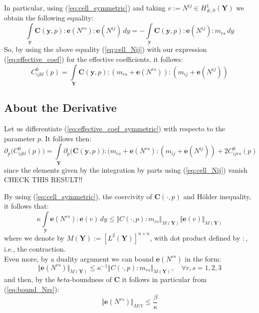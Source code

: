In particular, using (\ref{eq:cell_symmetric}) and taking $v := N^{ij} \in H^1_{\#,0}(\mathbf{Y})$ we obtain the following equality:
\begin{equation}
    \label{eq:cell_Nij}
    \int\limits_{\mathbf{y}}\mathbf{C}(\mathbf{y},p):\mathbf{e}(N^{rs}): \mathbf{e}(N^{ij}) \, dy = - \int\limits_{\mathbf{y}} \mathbf{C}(\mathbf{y},p):\mathbf{e}(N^{ij}):m_{rs}\, dy
\end{equation}
So, by using the above equality (\ref{eq:cell_Nij}) with our expression (\ref{eq:effective_coef}) for the effective coefficients, it follows:
\begin{equation}
    \label{eq:effective_coef_symmetric}
    C_{ijkl}^0(p) = \int\limits_{\mathbf{Y}} \mathbf{C}(\mathbf{y},p):(m_{rs}+\mathbf{e}(N^{rs})):(m_{ij}+\mathbf{e}(N^{ij}))
\end{equation}
\subsection{About the Derivative}
Let us differentiate (\ref{eq:effective_coef_symmetric}) with respecto to the parameter $p$. It follows then:
\begin{equation*}
    \partial_{p} \big( C_{ijkl}^0 (p) \big) = \int\limits_{\mathbf{Y}} \partial_{p}\big( \mathbf{C}(\mathbf{y},p) \big) : (m_{rs}+\mathbf{e}(N^{rs}) :(m_{ij}+\mathbf{e}(N^{ij})) + 2C_{ijrs}^0(p)
\end{equation*}
since the elements given by the integration by parts using (\ref{eq:cell_Nij}) vanish CHECK THIS RESULT!!

By using (\ref{eq:cell_symmetric}), the coercivity of $\mathbf{C}(\cdot, p)$ and H\"{o}lder inequality, it follows that:
\begin{equation*}
    \kappa \int\limits_{\mathbf{y}} \mathbf{e}(N^{rs}) : \mathbf{e}(v) \, dy \leq \Vert C(\cdot, p) :m_{rs}\Vert_{M(\mathbf{Y})} \Vert \mathbf{e}(v)\Vert_{M(\mathbf{Y})}
\end{equation*}
where we denote by $M(\mathbf{Y}):=[L^2 (\mathbf{Y})]^{n\times n}$, with dot product defined by $:$, i.e., the contraction. \\
Even more, by a duality argument we can bound $\mathbf{e}(N^{rs})$ in the form:
\begin{equation}
    \label{eq:bound_Nrs}
    \Vert \mathbf{e}(N^{rs}) \Vert_{M(\mathbf{Y})} \leq \kappa^{-1}\Vert C(\cdot, p) :m_{rs}\Vert_{M(\mathbf{Y})}, \quad \forall r,s =1,2,3
\end{equation}
and then, by the $beta$-boundness of $\mathbf{C}$ it follows in particular from (\ref{eq:bound_Nrs}):
\begin{equation*}
    \Vert \mathbf{e}(N^{rs}) \Vert_{M(\mathbb{Y}} \leq \frac{\beta}{\kappa}
\end{equation*}



